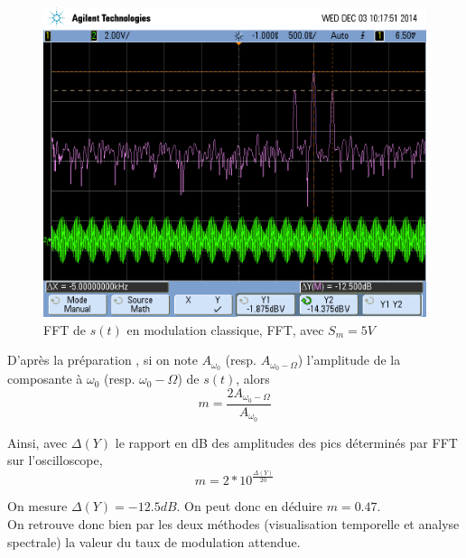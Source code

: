 \documentclass[../../Cours_M1.tex]{subfiles}
\begin{document}
\begin{figure}[h!]
\centering
\includegraphics[scale=0.2]{DBPC5FFT.png}
\caption{FFT de $s(t)$ en modulation classique, FFT, avec $S_m=5V$}
\end{figure}

D'après la préparation , si on note $A_{\omega_0}$ (resp. $A_{\omega_0-\Omega}$) l'amplitude de la composante à $\omega_0$ (resp. $\omega_0-\Omega$) de $s(t)$, alors \[m=\frac{2A_{\omega_0-\Omega}}{A_{\omega_0}}\]

Ainsi, avec $\Delta(Y)$ le rapport en dB des amplitudes des pics déterminés par FFT sur l'oscilloscope, \[m=2*10^{\frac{\Delta(Y)}{20}}\]

On mesure $\Delta(Y)=-12.5dB$. On peut donc en déduire $m=0.47$.\\

On retrouve donc bien par les deux méthodes (visualisation temporelle et analyse spectrale) la valeur du taux de modulation attendue.
\end{document}
